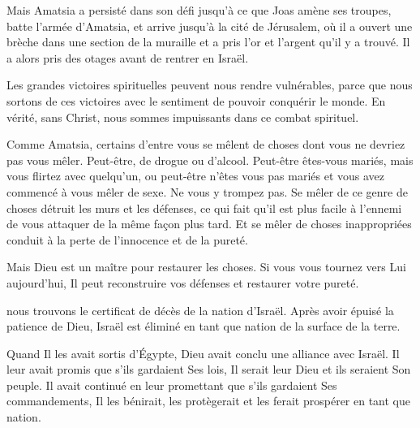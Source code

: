 Mais Amatsia a persisté dans son défi jusqu'à ce que Joas
 amène ses troupes, batte l'armée d'Amatsia, et arrive
 jusqu'à la cité de Jérusalem, où il a ouvert une brèche
 dans une section de la muraille et a pris l'or et l'argent
 qu'il y a trouvé.
 Il a alors pris des otages avant de rentrer en Israël. 


Les grandes victoires spirituelles peuvent nous rendre vulnérables,
 parce que nous sortons de ces victoires avec le sentiment de pouvoir
 conquérir le monde. En vérité, sans Christ, nous sommes impuissants
 dans ce combat spirituel. 

Comme Amatsia, certains d'entre vous se mêlent de choses
 dont vous ne devriez pas vous mêler. Peut-être, de drogue ou d'alcool.
 Peut-être êtes-vous mariés, mais vous flirtez avec quelqu'un,
 ou peut-être n'êtes vous pas mariés et vous avez commencé
 à vous mêler de sexe. Ne vous y trompez pas.
 Se mêler de ce genre de choses détruit les murs et les défenses,
 ce qui fait qu'il est plus facile à l'ennemi de vous attaquer
 de la même façon plus tard. Et se mêler de choses inappropriées
 conduit à la perte de l'innocence et de la pureté. 

Mais Dieu est un maître pour restaurer les choses.
 Si vous vous tournez vers Lui aujourd'hui,
 Il peut reconstruire vos défenses et restaurer votre pureté. 

\dvrule






 nous trouvons le
 \og certificat de décès \fg{} de la nation d'Israël.
 Après avoir épuisé la patience de Dieu,
 Israël est éliminé en tant que nation de la surface de la terre.

Quand Il les avait sortis d'Égypte, Dieu avait conclu
 une alliance avec Israël. Il leur avait promis
 que s'ils gardaient Ses lois,
 Il serait leur Dieu et ils seraient Son peuple.
 Il avait continué en leur promettant que s'ils gardaient Ses commandements,
 Il les bénirait, les protègerait et les ferait prospérer en tant que nation.

